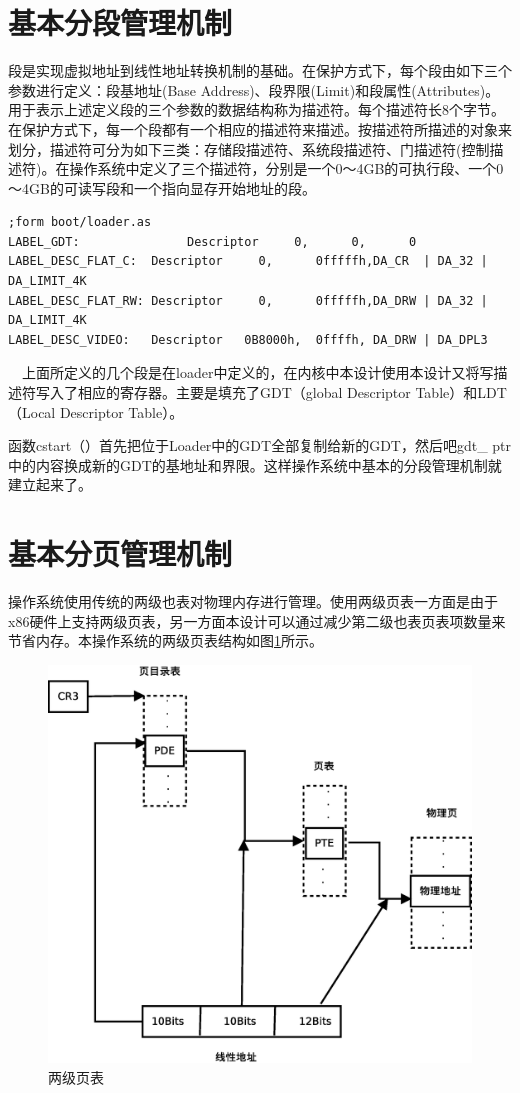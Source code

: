 \documentclass[UTF8,nofonts,cs4size]{ctexrep}
\begin{document}
\section{基本分段管理机制}
段是实现虚拟地址到线性地址转换机制的基础。在保护方式下，每个段由如下三个参数进行定义：段基地址(Base Address)、段界限(Limit)和段属性(Attributes)。用于表示上述定义段的三个参数的数据结构称为描述符。每个描述符长8个字节。在保护方式下，每一个段都有一个相应的描述符来描述。按描述符所描述的对象来划分，描述符可分为如下三类：存储段描述符、系统段描述符、门描述符(控制描述符)。在操作系统中定义了三个描述符，分别是一个0～4GB的可执行段、一个0～4GB的可读写段和一个指向显存开始地址的段。
\begin{lstlisting}
;form boot/loader.as
LABEL_GDT:               Descriptor     0,      0,      0
LABEL_DESC_FLAT_C:	Descriptor     0,      0fffffh,DA_CR  | DA_32 | DA_LIMIT_4K
LABEL_DESC_FLAT_RW:	Descriptor     0,      0fffffh,DA_DRW | DA_32 | DA_LIMIT_4K
LABEL_DESC_VIDEO:	Descriptor	 0B8000h,  0ffffh, DA_DRW | DA_DPL3	         
\end{lstlisting}
\indent \ \ 
上面所定义的几个段是在loader中定义的，在内核中本设计使用本设计又将写描述符写入了相应的寄存器。主要是填充了GDT（global Descriptor Table）和LDT（Local Descriptor Table）。

函数cstart（）首先把位于Loader中的GDT全部复制给新的GDT，然后吧gdt\_ ptr中的内容换成新的GDT的基地址和界限。这样操作系统中基本的分段管理机制就建立起来了。
\section{基本分页管理机制}
操作系统使用传统的两级也表对物理内存进行管理。使用两级页表一方面是由于x86硬件上支持两级页表，另一方面本设计可以通过减少第二级也表页表项数量来节省内存。本操作系统的两级页表结构如图\ref{page}所示。
\begin{figure}[htp]
\centering
\includegraphics[scale=0.4]{page.eps}
\caption{两级页表}
\label{page}
\end{figure}
\end{document}
